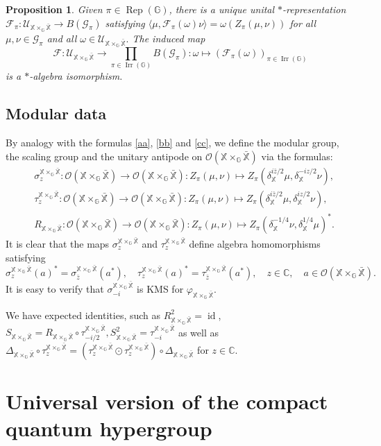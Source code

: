 \documentclass[reqno]{amsart}
\numberwithin{equation}{section}
\newtheorem{Prop}[Theorem]{Proposition}
\newcommand\XGX{\X\times_\G \bar{\X}}
\DeclareMathOperator{\id}{\mathrm{id}}
\DeclareMathOperator{\Rep}{\mathrm{Rep}}
\DeclareMathOperator{\Irr}{\mathrm{Irr}}
\newcommand{\mcG}{\mathcal{G}}
\newcommand{\mcO}{\mathcal{O}}
\newcommand{\C}{\mathbb{C}}
\newcommand{\G}{\mathbb{G}}
\newcommand{\X}{\mathbb{X}}
\begin{document}
\begin{Prop}\label{duality}
    Given  $\pi \in \Rep(\G)$, there is a unique unital $*$-representation
    $\mathscr{F}_\pi: \mathscr{U}_{\XGX}\to B(\mcG_\pi)$ satisfying
    $\langle \mu, \mathscr{F}_\pi(\omega)\nu\rangle = \omega(Z_\pi(\mu, \nu))$ for all $\mu, \nu \in \mcG_\pi$ and all $\omega \in \mathscr{U}_{\XGX}.$
    The induced map
    $$\mathscr{F}: \mathscr{U}_{\XGX}\to \prod_{\pi\in \Irr(\G)} B(\mcG_\pi): \omega \mapsto (\mathscr{F}_{\pi}(\omega))_{\pi\in \Irr(\G)}$$
    is a $*$-algebra isomorphism.
\end{Prop}

\subsection{Modular data} By analogy with the formulas \eqref{aa}, \eqref{bb} and \eqref{cc}, we define the modular group, the scaling group and the unitary antipode on $\mcO(\XGX)$ via the formulas:
\begin{align*}
    &\sigma_z^{\XGX}: \mcO(\XGX)\to \mcO(\XGX): Z_\pi(\mu, \nu) \mapsto Z_\pi(\delta_\X^{i\bar{z}/2}\mu, \delta_\X^{-iz/2}\nu), \\
    &\tau_z^{\XGX}: \mcO(\XGX)\to \mcO(\XGX): Z_\pi(\mu, \nu)\mapsto  Z_\pi(\delta_\X^{i\bar{z}/2}\mu, \delta_\X^{iz/2}\nu),\\
    &R_{\XGX}: \mcO(\XGX)\to \mcO(\XGX): Z_\pi(\mu, \nu) \mapsto Z_\pi(\delta_\X^{-1/4}\nu, \delta_\X^{1/4}\mu)^*.
\end{align*}
It is clear that the maps $\sigma_z^{\XGX}$ and $\tau_z^{\XGX}$ define algebra homomorphisms satisfying
$$\sigma_z^{\XGX}(a)^* = \sigma_{\bar{z}}^{\XGX}(a^*), \quad \tau_z^{\XGX}(a)^*= \tau_{\bar{z}}^{\XGX}(a^*), \quad z\in \C, \quad a \in \mcO(\XGX).$$
It is easy to verify that $\sigma_{-i}^{\XGX}$ is KMS for $\varphi_{\XGX}$.

We have expected identities, such as $R_{\XGX}^2 =  \id$, $S_{\XGX}= R_{\XGX}\circ \tau_{-i/2}^{\XGX}, S_{\XGX}^2 = \tau_{-i}^{\XGX}$ as well as $\Delta_{\XGX}\circ \tau_z^{\XGX}= (\tau_z^{\XGX}\odot \tau_z^{\XGX})\circ \Delta_{\XGX}$ for $z\in \C$.

\section{Universal version of the compact quantum hypergroup}
\label{universalversion}
\end{document}
